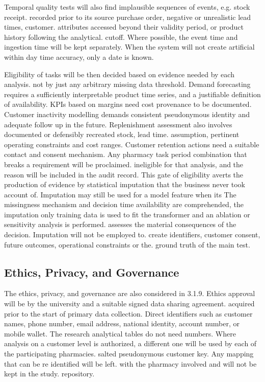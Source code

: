 \documentclass[a4paper,11pt,oneside]{book}
\theoremstyle{plain}
\theoremstyle{definition}
\theoremstyle{remark}
\begin{document}
Temporal quality tests will also find implausible sequences of events, e.g. stock receipt. recorded prior to its source purchase order, negative or unrealistic lead times, customer. attributes accessed beyond their validity period, or product history following the analytical. cutoff. Where possible, the event time and ingestion time will be kept separately. When the system will not create artificial within day time accuracy, only a date is known.

Eligibility of tasks will be then decided based on evidence needed by each analysis. not by just any arbitrary missing data threshold. Demand forecasting requires a sufficiently interpretable product time series, and a justifiable definition of availability. KPIs based on margins need cost provenance to be documented. Customer inactivity modelling demands consistent pseudonymous identity and adequate follow up in the future. Replenishment assessment also involves documented or defensibly recreated stock, lead time. assumption, pertinent operating constraints and cost ranges. Customer retention actions need a suitable contact and consent mechanism. Any pharmacy task period combination that breaks a requirement will be proclaimed. ineligible for that analysis, and the reason will be included in the audit record. This gate of eligibility averts the production of evidence by statistical imputation that the business never took account of. Imputation may still be used for a model feature when its The missingness mechanism and decision time availability are comprehended, the imputation only training data is used to fit the transformer and an ablation or sensitivity analysis is performed. assesses the material consequences of the decision. Imputation will not be employed to. create identifiers, customer consent, future outcomes, operational constraints or the. ground truth of the main test.

\subsection{Ethics, Privacy, and Governance}

The ethics, privacy, and governance are also considered in 3.1.9. Ethics approval will be by the university and a suitable signed data sharing agreement. acquired prior to the start of primary data collection. Direct identifiers such as customer names, phone number, email address, national identity, account number, or mobile wallet. The research analytical tables do not need numbers. Where analysis on a customer level is authorized, a different one will be used by each of the participating pharmacies. salted pseudonymous customer key. Any mapping that can be re identified will be left. with the pharmacy involved and will not be kept in the study. repository.
\end{document}
